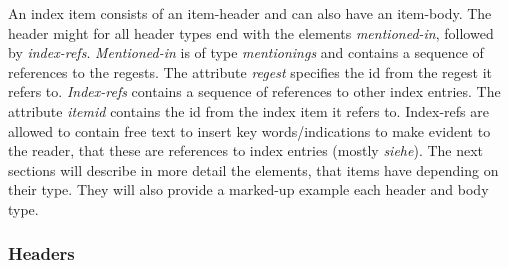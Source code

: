 
An index item consists of an item-header and can also have an item-body. The header might for all header types end with the elements \textit{mentioned-in}, followed by \textit{index-refs}. \textit{Mentioned-in} is of type \textit{mentionings} and contains a sequence of references to the regests. The attribute \textit{regest} specifies the id from the regest it refers to. \textit{Index-refs} contains  a sequence of references to other index entries. The attribute \textit{itemid} contains the id from the index item it refers to. Index-refs are allowed to contain free text to insert key words/indications to make evident to the reader, that these are references to index entries (mostly \textit{siehe}).
The next sections will describe in more detail the elements, that items have depending on their type. They will also provide a marked-up example each header and body type.

\subsubsection{Headers}

